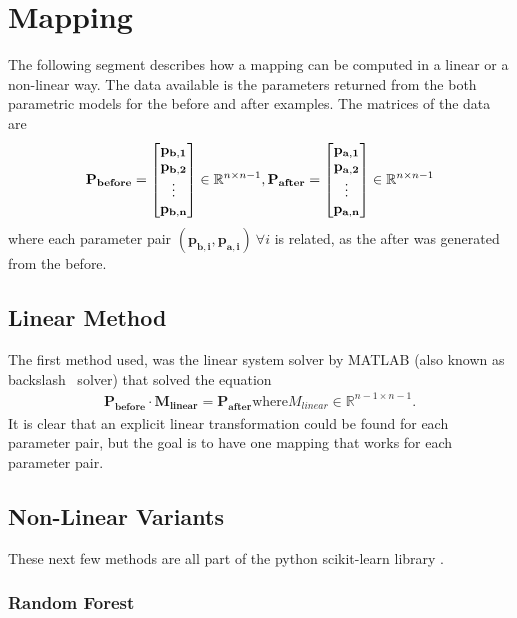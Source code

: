 \section{Mapping}
The following segment describes how a mapping can be computed in a linear or a non-linear way. The data available is the parameters returned from the both parametric models for the before and after examples. The matrices of the data are
\begin{gather}
  \mathbf{P_{before}} =
  \begin{bmatrix}
    \mathbf{p_{b,1}} \\
    \mathbf{p_{b,2}}  \\
    \vdots \\
    \mathbf{p_{b,n}}
  \end{bmatrix}
  \in \mathbb{R}^{n \times n-1},
  \mathbf{P_{after}} =
  \begin{bmatrix}
    \mathbf{p_{a,1}} \\
    \mathbf{p_{a,2}} \\
    \vdots \\
    \mathbf{p_{a,n}}
  \end{bmatrix}
  \in \mathbb{R}^{n \times n-1}
\end{gather}
where each parameter pair $(\mathbf{p_{b,i}}, \mathbf{p_{a,i}})\ \forall i$ is related, as the after was generated from the before.

\subsection{Linear Method}
The first method used, was the linear system solver by MATLAB (also known as backslash \ solver) that solved the equation
\begin{gather}
  \mathbf{P_{before}} \cdot \mathbf{M_{linear}} = \mathbf{P_{after}}
  \text{where} M_{linear} \in \mathbb{R}^{n-1 \times n-1}.
\end{gather}
It is clear that an explicit linear transformation could be found for each parameter pair, but the goal is to have one mapping that works for each parameter pair.
\subsection{Non-Linear Variants}
These next few methods are all part of the python scikit-learn library \cite{scikit-learn}.
\subsubsection{Random Forest}

